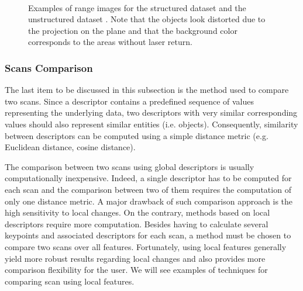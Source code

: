 \begin{figure}[H]
    \centering
    \\
    \caption{Examples of range images for the structured dataset \protect{} and the unstructured dataset \protect{}. Note that the objects look distorted due to the projection on the plane and that the background color corresponds to the areas without laser return.}
    \label{fig:chap_slam_range}
\end{figure}

\subsubsection{Scans Comparison}
\label{ssub:scans_comparison}

The last item to be discussed in this subsection is the method used to compare two scans. Since a descriptor contains a predefined sequence of values representing the underlying data, two descriptors with very similar corresponding values should also represent similar entities (i.e. objects). Consequently, similarity between descriptors can be computed using a simple distance metric (e.g. Euclidean distance, cosine distance).

The comparison between two scans using global descriptors is usually computationally inexpensive. Indeed, a single descriptor has to be computed for each scan and the comparison between two of them requires the computation of only one distance metric. A major drawback of such comparison approach is the high sensitivity to local changes.
On the contrary, methods based on local descriptors require more computation. Besides having to calculate several keypoints and associated descriptors for each scan, a method must be chosen to compare two scans over all features. Fortunately, using local features generally yield more robust results regarding local changes and also provides more comparison flexibility for the user. We will see examples of techniques for comparing scan using local features.

